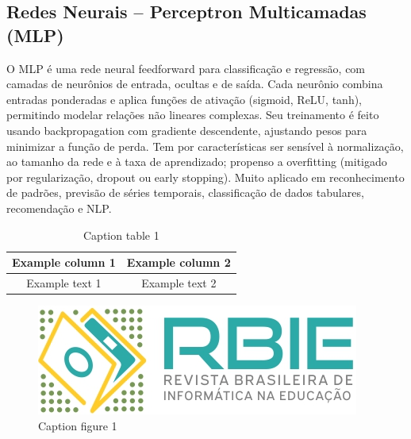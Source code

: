 \documentclass[english, spanish, brazilian]{RBIEarticle} %
\begin{document}
\subsection{Redes Neurais – Perceptron Multicamadas (MLP)}
O MLP é uma rede neural feedforward para classificação e regressão, com camadas de neurônios de entrada, ocultas e de saída. Cada neurônio combina entradas ponderadas e aplica funções de ativação (sigmoid, ReLU, tanh), permitindo modelar relações não lineares complexas.
 Seu treinamento é feito usando backpropagation com gradiente descendente, ajustando pesos para minimizar a função de perda.
 Tem por características ser sensível à normalização, ao tamanho da rede e à taxa de aprendizado; propenso a overfitting (mitigado por regularização, dropout ou early stopping).
 Muito aplicado em reconhecimento de padrões, previsão de séries temporais, classificação de dados tabulares, recomendação e NLP.




\iffalse %
    \begin{table}[h]
    	\caption{Caption table 1}
    	\label{tab:one}
    	\centering\footnotesize%
    	\begin{tabular}{|c|c|}
    		\hline
    		\rowcolor{gray} \textbf{Example column 1} & \textbf{Example column 2}\\
    		\hline
    		Example text 1 & Example text 2\\
    		\hline
    	\end{tabular}
    \end{table}


    
    \begin{figure}[h]
    	\centerline{\includegraphics[scale=0.25]{newlogo.png}}
    	\caption{Caption figure 1}
    	\label{fig:one}
    \end{figure}
\end{document}

